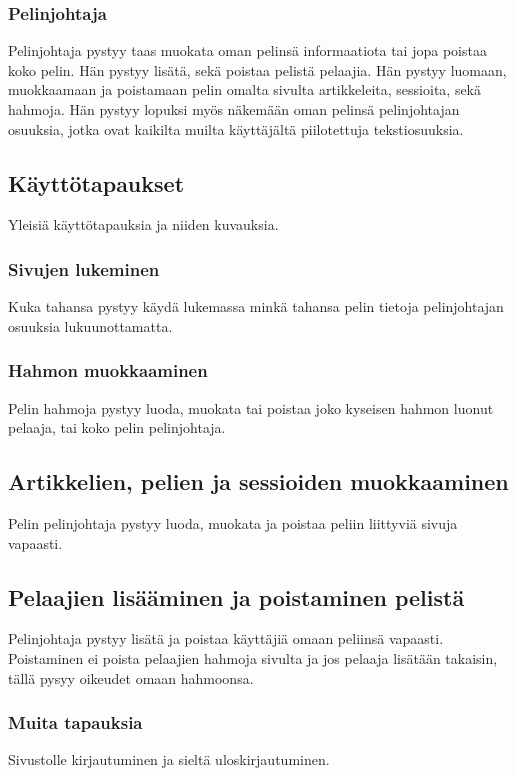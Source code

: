 \documentclass[11pt]{article}
\begin{document}
\subsubsection{Pelinjohtaja}
Pelinjohtaja pystyy taas muokata oman pelinsä informaatiota tai jopa poistaa koko pelin. Hän pystyy lisätä, sekä poistaa pelistä pelaajia. Hän pystyy luomaan, muokkaamaan ja poistamaan pelin omalta sivulta artikkeleita, sessioita, sekä hahmoja. Hän pystyy lopuksi myös näkemään oman pelinsä pelinjohtajan osuuksia, jotka ovat kaikilta muilta käyttäjältä piilotettuja tekstiosuuksia.

\subsection{Käyttötapaukset}
Yleisiä käyttötapauksia ja niiden kuvauksia.

\subsubsection{Sivujen lukeminen}
Kuka tahansa pystyy käydä lukemassa minkä tahansa pelin tietoja pelinjohtajan osuuksia lukuunottamatta.

\subsubsection{Hahmon muokkaaminen}
Pelin hahmoja pystyy luoda, muokata tai poistaa joko kyseisen hahmon luonut pelaaja, tai koko pelin pelinjohtaja. 

\subsection{Artikkelien, pelien ja sessioiden muokkaaminen}
Pelin pelinjohtaja pystyy luoda, muokata ja poistaa peliin liittyviä sivuja vapaasti. 

\subsection{Pelaajien lisääminen ja poistaminen pelistä}
Pelinjohtaja pystyy lisätä ja poistaa käyttäjiä omaan peliinsä vapaasti. Poistaminen ei poista pelaajien hahmoja sivulta ja jos pelaaja lisätään takaisin, tällä pysyy oikeudet omaan hahmoonsa.

\subsubsection{Muita tapauksia}
Sivustolle kirjautuminen ja sieltä uloskirjautuminen.
\end{document}
